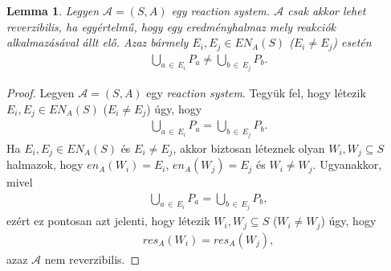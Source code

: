 \documentclass[12pt]{article}
\theoremstyle{definition}
\theoremstyle{remark}
\theoremstyle{plain}
\theoremstyle{plain}
\newtheorem*{lemma*}{Lemma}
\newcommand{\en}{\textit{en}}
\newcommand{\res}{\textit{res}}
\begin{document}
    \begin{lemma*}
        Legyen $\mathscr{A} = (S, A)$ egy \textit{reaction system}. $\mathscr{A}$ csak akkor lehet reverzibilis, ha egyértelmű, hogy egy eredményhalmaz mely reakciók alkalmazásával állt elő. Azaz bármely $E_{i}, E_{j} \in \textit{EN}_{A}(S)$ ($E_{i} \neq E_{j}$) esetén
        \begin{align*}
            \bigcup\limits_{a \,\in\, E_{i}} P_{a} \neq \bigcup\limits_{b \,\in\, E_{j}} P_{b}.
        \end{align*}
    \end{lemma*}

    \begin{proof}
        Legyen $\mathscr{A} = (S, A)$ egy \textit{reaction system}. Tegyük fel, hogy létezik $E_{i}, E_{j} \in \textit{EN}_{A}(S)$ ($E_{i} \neq E_{j}$) úgy, hogy
        \begin{align*}
            \bigcup\limits_{a \,\in\, E_{i}} P_{a} = \bigcup\limits_{b \,\in\, E_{j}} P_{b}.
        \end{align*}
        Ha $E_{i}, E_{j} \in \textit{EN}_{A}(S)$ és $E_{i} \neq E_{j}$, akkor biztosan léteznek olyan $W_{i}, W_{j} \subseteq S$ halmazok, hogy $\en_{A}(W_{i}) = E_{i}$, $\en_{A}(W_{j}) = E_{j}$ és $W_{i} \neq W_{j}$. Ugyanakkor, mivel
        \begin{align*}
            \bigcup\limits_{a \,\in\, E_{i}} P_{a} = \bigcup\limits_{b \,\in\, E_{j}} P_{b},
        \end{align*}
        ezért ez pontosan azt jelenti, hogy létezik $W_{i}, W_{j} \subseteq S$ ($W_{i} \neq W_{j}$) úgy, hogy
        \begin{align*}
            \res_{A}(W_{i}) = \res_{A}(W_{j}),
        \end{align*}
        azaz $\mathscr{A}$ nem reverzibilis.
    \end{proof}
\end{document}
